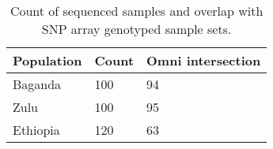 \begin{table}[h]
\centering
\begin{tabular}{l|ll}
Population & Count & Omni intersection \\ \hline
Baganda    & 100   & 94                \\
Zulu       & 100   & 95                \\
Ethiopia   & 120   & 63               
\end{tabular}
\caption{Count of sequenced samples and overlap with SNP array genotyped sample sets.}
\label{tab:sequence_sample_summary}
\end{table}